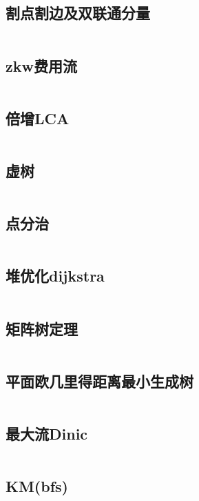 \documentclass[UTF8]{ctexart}
\begin{document}
\subsection{割点割边及双联通分量}
\inputminted{cpp}{graphtheory/割点割边及双联通分量.cpp}

\subsection{zkw费用流}
\inputminted{cpp}{graphtheory/zkw费用流.cpp}

\subsection{倍增LCA}
\inputminted{cpp}{graphtheory/倍增LCA.cpp}

\subsection{虚树}
\inputminted{cpp}{graphtheory/VirtualTree.cpp}

\subsection{点分治}
\inputminted{cpp}{graphtheory/点分治.cpp}

\subsection{堆优化dijkstra}
\inputminted{cpp}{graphtheory/堆优化dijkstra.cpp}

\subsection{矩阵树定理}
\inputminted{cpp}{graphtheory/矩阵树定理.cpp}

\subsection{平面欧几里得距离最小生成树}
\inputminted{cpp}{graphtheory/平面欧几里得距离最小生成树.cpp}

\subsection{最大流Dinic}
\inputminted{cpp}{graphtheory/最大流Dinic.cpp}

\subsection{KM(bfs)}
\inputminted{cpp}{graphtheory/KM_bfs.cpp}
\end{document}
